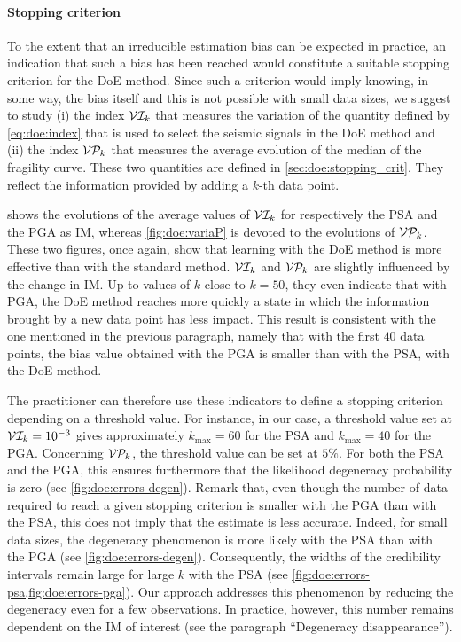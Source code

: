     \paragraph{{Stopping criterion}} {To the extent that an irreducible estimation bias can be expected in practice, an indication that such a bias has been reached would constitute a suitable stopping criterion for the DoE method. Since such a criterion would imply knowing, in some way, the bias itself and this is not possible with small data sizes, we suggest to study (i) the index $\mathcal{V}\mathcal{I}_k$ that measures the variation of the  quantity defined by \cref{eq:doe:index} that is used to select the seismic signals in the DoE method and (ii) the index $\mathcal{V}\mathcal{P}_k$ that measures the average evolution of the median of the fragility curve. These two quantities are defined in \cref{sec:doe:stopping_crit}. They reflect the information provided by adding a $k$-th data point. 

      shows the evolutions of the average values of $\mathcal{V}\mathcal{I}_k$ for respectively the PSA and the PGA as IM, whereas  \cref{fig:doe:variaP} is devoted to the evolutions of $\mathcal{V}\mathcal{P}_k$. These two figures, once again, show that learning with the DoE method is more effective than with the standard method. $\mathcal{V}\mathcal{I}_k$ and $\mathcal{V}\mathcal{P}_k$ are slightly influenced by the change in IM. Up to values of $k$ close to $k=50$, they even indicate that with PGA, the DoE method reaches more quickly a state in which the information brought by a new data point has less impact. This result is consistent with the one mentioned in the previous paragraph, namely that with the first $40$ data points, the bias value obtained with the PGA is smaller than with the PSA, with the DoE method.
    
    The practitioner can therefore use these indicators to define a stopping criterion depending on a threshold value. For instance, in our case, a threshold value set at $\mathcal{V}\mathcal{I}_k = 10^{-3}$ gives approximately $k_{\max} = 60$ for the PSA and $k_{\max} = 40$ for the PGA. Concerning $\mathcal{V}\mathcal{P}_k$, the threshold value can be set at $5 \% $. For both the PSA and the PGA, this ensures furthermore that the likelihood degeneracy probability is zero (see  \cref{fig:doe:errors-degen}). 
    Remark that, even though the number of data required to reach a given stopping criterion is smaller with the PGA than with the PSA, this does not imply that the estimate is less accurate. Indeed, for small data sizes, the degeneracy phenomenon is more likely with the PSA than with the PGA (see  \cref{fig:doe:errors-degen}). Consequently, the widths of the credibility intervals remain large for large $k$ with the PSA (see \cref{fig:doe:errors-psa,fig:doe:errors-pga}). Our approach addresses this phenomenon by reducing the degeneracy even for a few observations. In practice, however, this number remains dependent on the IM of interest (see the paragraph ``Degeneracy disappearance'').
    
    }
        
